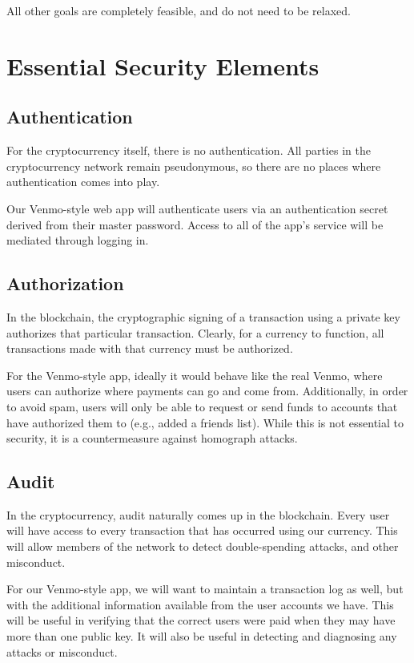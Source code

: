 \documentclass[12pt]{article}
\begin{document}
All other goals are completely feasible, and do not need to be relaxed.

\section{Essential Security Elements}

\subsection{Authentication}

For the cryptocurrency itself, there is no authentication. All parties in the cryptocurrency network remain pseudonymous, so there are no places where authentication comes into play.

Our Venmo-style web app will authenticate users via an authentication secret derived from their master password. Access to all of the app's service will be mediated through logging in.

\subsection{Authorization}

In the blockchain, the cryptographic signing of a transaction using a private key authorizes that particular transaction. Clearly, for a currency to function, all transactions made with that currency must be authorized.

For the Venmo-style app, ideally it would behave like the real Venmo, where users can authorize where payments can go and come from.
Additionally, in order to avoid spam, users will only be able to request or send funds to accounts that have authorized them to (e.g., added a friends list).
While this is not essential to security, it is a countermeasure against homograph attacks.

\subsection{Audit}

In the cryptocurrency, audit naturally comes up in the blockchain. Every user will have access to every transaction that has occurred using our currency. This will allow members of the network to detect double-spending attacks, and other misconduct.

For our Venmo-style app, we will want to maintain a transaction log as well, but with the additional information available from the user accounts we have.
This will be useful in verifying that the correct users were paid when they may have more than one public key. It will also be useful in detecting and diagnosing any attacks or misconduct.
\end{document}
